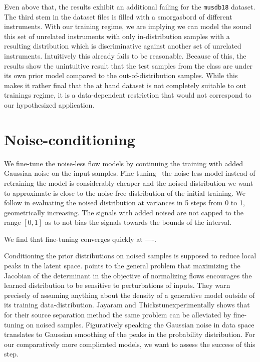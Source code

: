 Even above that, the results exhibit an additional failing for the \texttt{musdb18} dataset. The third stem in the dataset files  is filled with a smorgasbord of different instruments. With our training regime, we are implying we can model the sound this set of unrelated instruments with only in-distribution samples with a resulting distribution which is discriminative against another set of unrelated instruments. Intuitively this already fails to be reasonable. Because of this, the results show the unintuitive result that the test samples from the  class are  under its own prior model compared to the out-of-distribution samples. While this makes it rather final that the at hand dataset is not completely suitable to out trainings regime, it is a data-dependent restriction that would not correspond to our hypothesized application.

\section{Noise-conditioning}
We fine-tune the noise-less flow models by continuing the training with added Gaussian noise on the input samples. Fine-tuning~\cite{yosinskiHow2014} the noise-less model instead of retraining the model is considerably cheaper and the noised distribution we want to approximate is close to the noise-free distribution of the initial training. We follow \textcite{jayaramSource2020} in evaluating the noised distribution at variances in 5 steps from 0 to 1, geometrically increasing. The signals with added noised are not capped to the range \([0,1]\) as to not bias the signals towards the bounds of the interval.

We find that fine-tuning converges quickly at ----.

Conditioning the prior distributions on noised samples is supposed to reduce local peaks in the latent space. \textcite{nalisnickDeep2019} points to the general problem that maximizing the Jacobian of the determinant in the objective of normalizing flows encourages the learned distribution to be sensitive to perturbations of inputs. They warn precisely of assuming anything about the density of a generative model outside of its training data-distribution. Jayaram and Thickstun experimentally shows that for their source separation method the same problem can be alleviated by fine-tuning on noised samples. Figuratively speaking the Gaussian noise in data space translates to Gaussian smoothing of the peaks in the probability distribution. For our comparatively more complicated models, we want to assess the success of this step.

